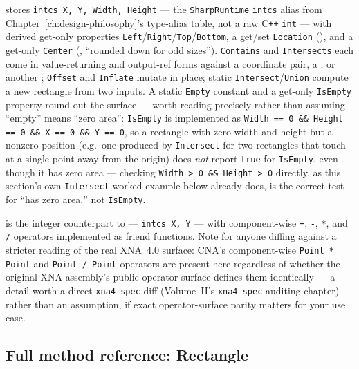  stores \texttt{intcs X, Y, Width, Height} --- the
\texttt{SharpRuntime} \texttt{intcs} alias from Chapter~\ref{ch:design-philosophy}'s type-alias
table, not a raw C\texttt{++} \texttt{int} --- with derived get-only properties
\texttt{Left}/\texttt{Right}/\texttt{Top}/\texttt{Bottom}, a get/set \texttt{Location}
(), and a get-only \texttt{Center} (, ``rounded down for odd
sizes''). \texttt{Contains} and \texttt{Intersects} each come in value-returning and
output-ref forms against a coordinate pair, a , or another
; \texttt{Offset} and \texttt{Inflate} mutate in place; static
\texttt{Intersect}/\texttt{Union} compute a new rectangle from two inputs. A static
\texttt{Empty} constant and a get-only \texttt{IsEmpty} property round out the surface ---
worth reading precisely rather than assuming ``empty'' means ``zero area'': \texttt{IsEmpty}
is implemented as \texttt{Width == 0 \&\& Height == 0 \&\& X == 0 \&\& Y == 0}, so a rectangle
with zero width and height but a nonzero position (e.g.\ one produced by \texttt{Intersect}
for two rectangles that touch at a single point away from the origin) does \emph{not} report
\texttt{true} for \texttt{IsEmpty}, even though it has zero area --- checking
\texttt{Width > 0 \&\& Height > 0} directly, as this section's own \texttt{Intersect} worked
example below already does, is the correct test for ``has zero area,'' not \texttt{IsEmpty}.

 is the integer counterpart to  --- \texttt{intcs X, Y} ---
with component-wise \texttt{+}, \texttt{-}, \texttt{*}, and \texttt{/} operators implemented
as friend functions. Note for anyone diffing against a stricter reading of the real XNA~4.0
 surface: CNA's component-wise \texttt{Point * Point} and \texttt{Point /
Point} operators are present here regardless of whether the original XNA assembly's public
operator surface defines them identically --- a detail worth a direct \texttt{xna4-spec}
diff (Volume~II's \texttt{xna4-spec} auditing chapter) rather than an assumption, if exact
operator-surface parity matters for your use case.

\subsection{Full method reference: Rectangle}


